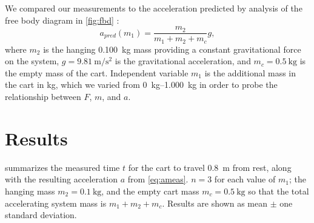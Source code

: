 ﻿\documentclass[reprint,amsmath,amssymb,prl]{revtex4-2}
\begin{document}

We compared our measurements to the acceleration predicted by analysis of the free body diagram in \cref{fig:fbd} \cite{knight2017physics}:
\begin{equation}
a_{pred}(m_1) = \dfrac{m_2}{m_1 + m_2 + m_c} g,
\label{eq:apred}
\end{equation}
where $m_2$ is the hanging \qty{0.100}{\kilo\gram} mass providing a constant gravitational force on the system, $g=\qty{9.81}{\meter\per\second\squared}$ is the gravitational acceleration, and $m_c=\qty{0.5}{\kilo\gram}$ is the empty mass of the cart. Independent variable $m_1$ is the additional mass in the cart in \unit{\kilo\gram}, which we varied from \qtyrange{0}{1.000}{\kilo\gram} in order to probe the relationship between $F$, $m$, and $a$.  






\section{Results}

 summarizes the measured time $t$ for the cart to travel \qty{0.8}{\meter} from rest, along with the resulting acceleration $a$ from \cref{eq:ameas}. $n=3$ for each value of $m_1$; the hanging mass $m_2=\qty{0.1}{\kilo\gram}$, and the empty cart mass $m_c=\qty{0.5}{\kilo\gram}$ so that the total accelerating system mass is $m_1+m_2+m_c$. Results are shown as mean $\pm$ one standard deviation. 

\end{document}
